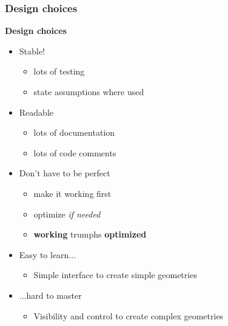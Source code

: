 \documentclass{beamer}
\theoremstyle{plain}
\theoremstyle{definition}
\begin{document}
\begin{frame}
\frametitle{Design choices}
\textbf{Design choices}
\begin{itemize}
    \item Stable!
    \begin{itemize}
        \item lots of testing
        \item state assumptions where used
    \end{itemize}
    \pause
    \item Readable
    \begin{itemize}
        \item lots of documentation
        \item lots of code comments
    \end{itemize}
    \pause
    \item Don't have to be perfect
    \begin{itemize}
        \item make it working first
        \item optimize \emph{if needed}
        \pause
        \item \textbf{working} trumphs \textbf{optimized}
    \end{itemize}
    \pause
    \item Easy to learn...
    \begin{itemize}
        \item Simple interface to create simple geometries
    \end{itemize}
    \pause
    \item ...hard to master
    \begin{itemize}
        \item Visibility and control to create complex geometries
    \end{itemize}
\end{itemize}
\end{frame}

\end{document}
